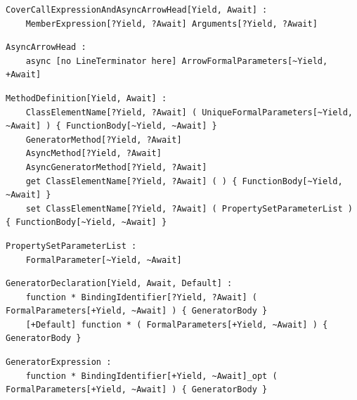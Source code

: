 \noindent\textbf{\texttt{}}\par
\begin{lstlisting}
CoverCallExpressionAndAsyncArrowHead[Yield, Await] :
    MemberExpression[?Yield, ?Await] Arguments[?Yield, ?Await]
\end{lstlisting}

\noindent\textbf{\texttt{}}\par
\begin{lstlisting}
AsyncArrowHead :
    async [no LineTerminator here] ArrowFormalParameters[~Yield, +Await]
\end{lstlisting}

\noindent\textbf{\texttt{}}\par
\begin{lstlisting}
MethodDefinition[Yield, Await] :
    ClassElementName[?Yield, ?Await] ( UniqueFormalParameters[~Yield, ~Await] ) { FunctionBody[~Yield, ~Await] }
    GeneratorMethod[?Yield, ?Await]
    AsyncMethod[?Yield, ?Await]
    AsyncGeneratorMethod[?Yield, ?Await]
    get ClassElementName[?Yield, ?Await] ( ) { FunctionBody[~Yield, ~Await] }
    set ClassElementName[?Yield, ?Await] ( PropertySetParameterList ) { FunctionBody[~Yield, ~Await] }
\end{lstlisting}

\noindent\textbf{\texttt{}}\par
\begin{lstlisting}
PropertySetParameterList :
    FormalParameter[~Yield, ~Await]
\end{lstlisting}

\noindent\textbf{\texttt{}}\par
\begin{lstlisting}
GeneratorDeclaration[Yield, Await, Default] :
    function * BindingIdentifier[?Yield, ?Await] ( FormalParameters[+Yield, ~Await] ) { GeneratorBody }
    [+Default] function * ( FormalParameters[+Yield, ~Await] ) { GeneratorBody }
\end{lstlisting}

\noindent\textbf{\texttt{}}\par
\begin{lstlisting}
GeneratorExpression :
    function * BindingIdentifier[+Yield, ~Await]_opt ( FormalParameters[+Yield, ~Await] ) { GeneratorBody }
\end{lstlisting}

